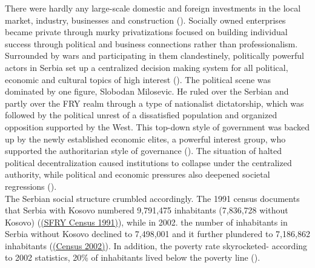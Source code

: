 \documentclass[11pt]{report}
\begin{document}
There were hardly any large-scale domestic and foreign investments in the local market, industry, businesses and construction (\href{Vujosevic}{\citealt{vujosevic_planning_2006}}).
Socially owned enterprises became private through murky privatizations focused on building individual success through political and business connections rather than professionalism.
Surrounded by wars and participating in them clandestinely, politically powerful actors in Serbia set up a centralized decision making system for all political, economic and cultural topics of high interest (\href{Nedovic}{\citealt{nedovic-budic_mornings_2011}}).
The political scene was dominated by one figure, Slobodan Milosevic. He ruled over the Serbian and partly over the FRY realm through a type of nationalist dictatorship, which was followed by the political unrest of a dissatisfied population and organized opposition supported by the West. This top-down style of government was backed up by the newly established economic elites, a powerful interest group, who supported the authoritarian style of governance (\href{Vujovic}{\citealt{vujovic_belgrades_2007}}).
The situation of halted political decentralization caused institutions to collapse under the centralized authority, while political and economic pressures also deepened societal regressions (\href{Nedovic}{\citealt{nedovic-budic_mornings_2011}}). 
\\

The Serbian social structure crumbled accordingly. The 1991 census documents that Serbia with Kosovo numbered 9,791,475 inhabitants (7,836,728 without Kosovo) (\href{ref}{(SFRY Census 1991)}), while in 2002. the number of inhabitants in Serbia without Kosovo declined to 7,498,001 and it further plundered to 7,186,862 inhabitants (\href{ref}{(Census 2002)}).
In addition, the poverty rate skyrocketed- according to 2002 statistics, 20\% of inhabitants lived below the poverty line (\href{Vlada}{\citealt{strategija_vlade_r._srbije_strategija_2003}}).
\\
\end{document}
